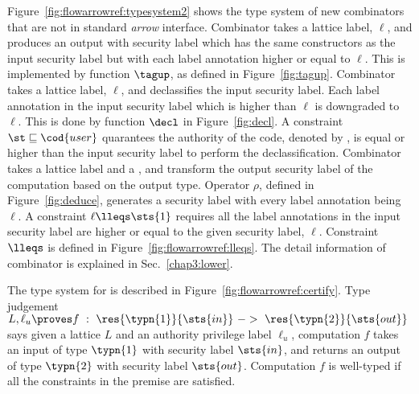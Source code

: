 Figure~\ref{fig:flowarrowref:typesystem2} shows the type system of new combinators that are not
in standard {\em arrow} interface. Combinator  takes a lattice label, $\ell$, and produces an output
with security label which has the same constructors as the input security label but with each label annotation 
higher or equal to $\ell$. This is implemented by function $\tagup$, as defined in Figure~\ref{fig:tagup}.
Combinator  takes a lattice label, $\ell$, and declassifies the input security label. 
Each label annotation in the input security label which is higher than $\ell$ is downgraded to $\ell$.
This is done by function $\decl$ in Figure~\ref{fig:decl}. A constraint $\st\sqsubseteq \cod{user}$
quarantees the authority of the code, denoted by , is equal or higher than the input
security label to perform the declassification. 
Combinator  takes a lattice label
and a , and transform the output security label of the computation based on the output
type. Operator $\rho$, defined in Figure~\ref{fig:deduce}, generates a security label with every label 
annotation being $\ell$. A constraint $\ell\lleqs \sts{1}$ requires all the label annotations in the 
input security label are higher or equal to the given security label, $\ell$. Constraint $\lleqs$ is
defined in Figure~\ref{fig:flowarrowref:lleqs}.
The detail information of combinator  is explained in Sec.~\ref{chap3:lower}.

The type system for  is described in Figure~\ref{fig:flowarrowref:certify}. Type judgement
$L,\ell_u\proves f~:~\res{\typn{1}}{\sts{in}}~->~\res{\typn{2}}{\sts{out}}$ says given a lattice $L$ and 
an authority privilege label $\ell_u$, computation $f$ takes an input of type $\typn{1}$ with security 
label $\sts{in}$, and returns an output of type $\typn{2}$ with security label $\sts{out}$.
Computation $f$ is well-typed if all the constraints in the premise are satisfied.

